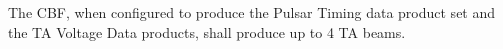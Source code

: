 The CBF, when configured to produce the Pulsar Timing data product set and the
TA Voltage Data products, shall produce up to 4 TA beams.
